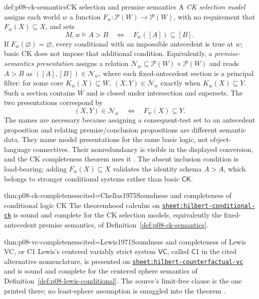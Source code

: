\begin{hbdefinition}{def:p08-ck-semantics}{CK selection and premise semantics}
A \emph{CK selection model} assigns each world \(w\) a function
\(F_w:\mathcal P(W)\to\mathcal P(W)\), with no requirement that
\(F_w(X)\subseteq X\), and sets
\[
 M,w\models A>B
 \quad\Longleftrightarrow\quad
 F_w([A])\subseteq[B].
\]
If \(F_w(\varnothing)=\varnothing\), every conditional with an impossible
antecedent is true at \(w\); basic CK does not impose that additional condition.
Equivalently, a \emph{premise-semantics presentation} assigns a relation
\(\mathcal N_w\subseteq\mathcal P(W)\times\mathcal P(W)\) and reads
\(A>B\) as \(([A],[B])\in\mathcal N_w\), where each fixed-antecedent section
is a principal filter: for some core \(K_w(X)\subseteq W\),
\((X,Y)\in\mathcal N_w\) exactly when \(K_w(X)\subseteq Y\).  Such a section
contains \(W\) and is closed under intersection and supersets.  The two
presentations correspond by
\[
 (X,Y)\in\mathcal N_w
 \quad\Longleftrightarrow\quad F_w(X)\subseteq Y.
\]
The names are necessary because assigning a consequent-test set to an
antecedent proposition and relating premise/conclusion propositions are
different semantic data.  They
name model presentations for the same basic logic, not object-language
connectives.  Their nonredundancy is visible in the displayed conversion, and
the CK completeness theorem uses it \cite{Chellas1975}.  The absent inclusion
condition is load-bearing: adding \(F_w(X)\subseteq X\) validates the identity
schema \(A>A\), which belongs to stronger conditional systems rather than
basic \(\mathsf{CK}\).
\end{hbdefinition}

\begin{hbtheorem}{thm:p08-ck-completeness}{cited=Chellas1975}{Soundness and completeness of conditional logic CK}
The theoremhood calculus on
\hyperref[sheet:hilbert-conditional-ck]{\texttt{sheet:hilbert-conditional-ck}}
is sound and complete for the CK selection models, equivalently the
fixed-antecedent premise semantics, of
Definition~\ref{def:p08-ck-semantics}.
\end{hbtheorem}

\begin{hbtheorem}{thm:p08-vc-completeness}{cited=Lewis1971}{Soundness and completeness of Lewis VC, or C1}
Lewis's centered variably strict system \(\mathsf{VC}\), called
\(\mathsf{C1}\) in the cited alternative nomenclature, is presented on
\hyperref[sheet:hilbert-counterfactual-vc]{\texttt{sheet:hilbert-counterfactual-vc}}
and is sound and complete for the centered sphere semantics of
Definition~\ref{def:p08-lewis-conditional}.  The source's limit-free clause is
the one printed there; no least-sphere assumption is smuggled into the theorem
\cite{Wen2019}.
\end{hbtheorem}

